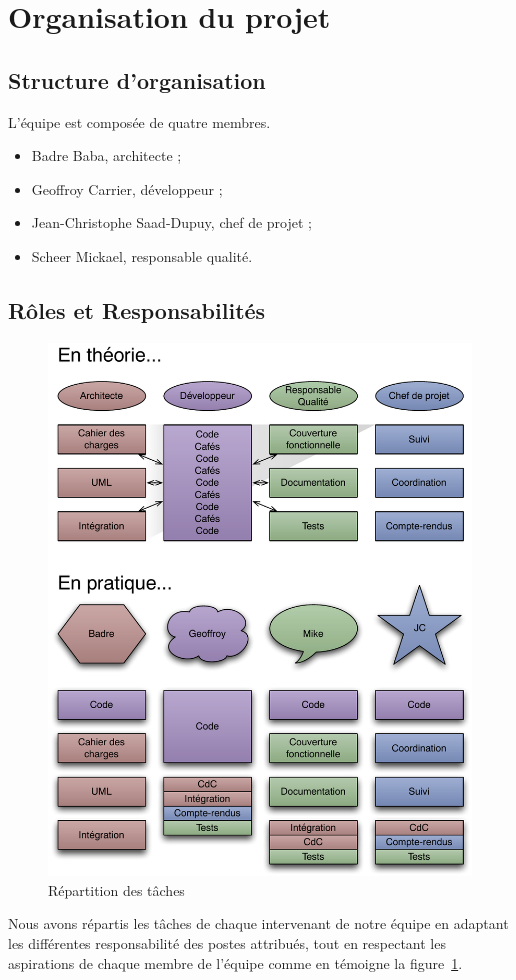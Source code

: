 
\section{Organisation du projet}
\subsection{Structure d’organisation}
L'équipe est composée de quatre membres.
\begin{itemize}
	\item Badre Baba, architecte ;
	\item Geoffroy Carrier, développeur ;
	\item Jean-Christophe Saad-Dupuy, chef de projet ;
	\item Scheer Mickael, responsable qualité.
\end{itemize}

\subsection{Rôles et Responsabilités}
\begin{figure}[thbp]
	\centering
		\includegraphics[width=15cm]{../diagrammes/repartition_taches.pdf}
	\caption{Répartition des tâches}
	\label{fig:repartition}
\end{figure}

Nous avons répartis les tâches de chaque intervenant de notre équipe en adaptant les différentes responsabilité des postes attribués, tout en respectant les aspirations de chaque membre de l'équipe comme en témoigne la figure~\ref{fig:repartition}.
